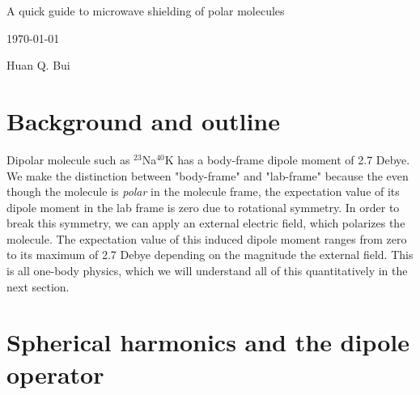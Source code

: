 \documentclass{article}
\theoremstyle{definition}
\begin{document}
\begin{center}
	\Large{A quick guide to microwave shielding of polar molecules}
\end{center}	

\begin{center}
	\today
\end{center}

\begin{center}
Huan Q. Bui
\end{center}

\section{Background and outline}

Dipolar molecule such as $^{23}$Na$^{40}$K has a body-frame dipole moment of 2.7 Debye. We make the distinction between "body-frame" and "lab-frame" because the even though the molecule is \textit{polar} in the molecule frame, the expectation value of its dipole moment in the lab frame is zero due to rotational symmetry. In order to break this symmetry, we can apply an external electric field, which polarizes the molecule. The expectation value of this induced dipole moment ranges from zero to its maximum of 2.7 Debye depending on the magnitude the external field. This is all one-body physics, which we will understand all of this quantitatively in the next section.

\section{Spherical harmonics and the dipole operator}
\end{document}
